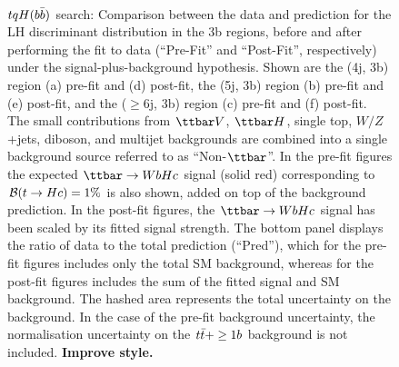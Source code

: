 \begin{figure}[htbp]
\begin{center}
 \\
\caption{\small{$tqH(b\bar{b})$ search: Comparison between the data and prediction for the LH discriminant distribution in the 3b regions,
before and after performing the fit to data  (``Pre-Fit'' and ``Post-Fit'', respectively) under the signal-plus-background hypothesis.
Shown are the (4j, 3b) region (a) pre-fit and (d) post-fit,  the (5j, 3b) region (b) pre-fit and (e) post-fit, and
the ($\geq$6j, 3b) region (c) pre-fit and (f) post-fit.
The small contributions from $\ttbar V$, $\ttbar H$, single top, $W/Z$+jets, diboson, and multijet backgrounds are combined into a single background source 
referred to as ``Non-$\ttbar$''. 
In the pre-fit figures the expected $\Hc$ signal (solid red) corresponding to $\mathcal{B}(t\to Hc)=1\%$ is also shown,
added on top of the background prediction. In the post-fit figures, the $\Hc$ signal has been scaled by its fitted signal strength.
The bottom panel displays the ratio of data to the total prediction (``Pred''), which for the pre-fit figures includes only the total SM background,
whereas for the post-fit figures includes the sum of the fitted signal and SM background.
The hashed area represents the total uncertainty on the background.
In the case of the pre-fit background uncertainty, the normalisation uncertainty on the $t\bar{t}+\geq1b$ background is not included. \textbf{Improve style.}}}
\label{fig:prepostfit_unblinded_WbHc_3btagex}
\end{center}
\end{figure}

